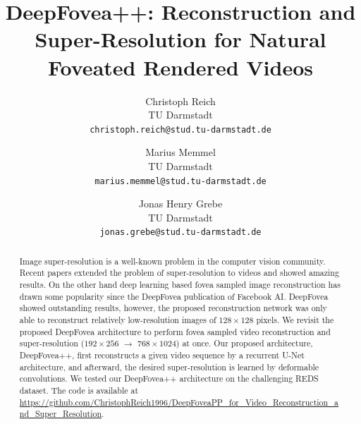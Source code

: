 \documentclass[10pt,twocolumn,letterpaper]{article}
\begin{document}
\title{DeepFovea++: Reconstruction and Super-Resolution for Natural Foveated Rendered Videos}

\author{
    Christoph Reich\\
    TU Darmstadt\\
    {\tt\small christoph.reich@stud.tu-darmstadt.de}
    
    \and
    Marius Memmel\\
    TU Darmstadt\\
    {\tt\small marius.memmel@stud.tu-darmstadt.de}
    
    \and
    Jonas Henry Grebe\\
    TU Darmstadt\\
    {\tt\small jonas.grebe@stud.tu-darmstadt.de}
}



\begin{abstract}
Image super-resolution is a well-known problem in the computer vision community. Recent papers extended the problem of super-resolution to videos and showed amazing results. On the other hand deep learning based fovea sampled image reconstruction has drawn some popularity since the DeepFovea publication of Facebook AI. DeepFovea showed outstanding results, however, the proposed reconstruction network was only able to reconstruct relatively low-resolution images of $128\times128$ pixels. We revisit the proposed DeepFovea architecture to perform fovea sampled video reconstruction and super-resolution ($192 \times 256$ $\to$ $768 \times 1024$) at once. Our proposed architecture, DeepFovea++, first reconstructs a given video sequence by a recurrent U-Net architecture, and afterward, the desired super-resolution is learned by deformable convolutions. We tested our DeepFovea++ architecture on the challenging REDS dataset. The code is available at \url{https://github.com/ChristophReich1996/DeepFoveaPP_for_Video_Reconstruction_and_Super_Resolution}.
\end{abstract}
\end{document}
